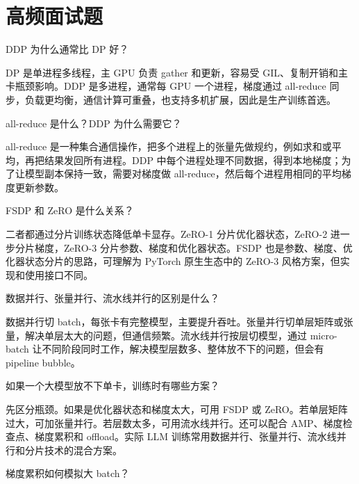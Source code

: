 \section{高频面试题}
\begin{interview}
DDP 为什么通常比 DP 好？
\end{interview}
\begin{answer}
DP 是单进程多线程，主 GPU 负责 gather 和更新，容易受 GIL、复制开销和主卡瓶颈影响。DDP 是多进程，通常每 GPU 一个进程，梯度通过 all-reduce 同步，负载更均衡，通信计算可重叠，也支持多机扩展，因此是生产训练首选。
\end{answer}
\begin{interview}
all-reduce 是什么？DDP 为什么需要它？
\end{interview}
\begin{answer}
all-reduce 是一种集合通信操作，把多个进程上的张量先做规约，例如求和或平均，再把结果发回所有进程。DDP 中每个进程处理不同数据，得到本地梯度；为了让模型副本保持一致，需要对梯度做 all-reduce，然后每个进程用相同的平均梯度更新参数。
\end{answer}
\begin{interview}
FSDP 和 ZeRO 是什么关系？
\end{interview}
\begin{answer}
二者都通过分片训练状态降低单卡显存。ZeRO-1 分片优化器状态，ZeRO-2 进一步分片梯度，ZeRO-3 分片参数、梯度和优化器状态。FSDP 也是参数、梯度、优化器状态分片的思路，可理解为 PyTorch 原生生态中的 ZeRO-3 风格方案，但实现和使用接口不同。
\end{answer}
\begin{interview}
数据并行、张量并行、流水线并行的区别是什么？
\end{interview}
\begin{answer}
数据并行切 batch，每张卡有完整模型，主要提升吞吐。张量并行切单层矩阵或张量，解决单层太大的问题，但通信频繁。流水线并行按层切模型，通过 micro-batch 让不同阶段同时工作，解决模型层数多、整体放不下的问题，但会有 pipeline bubble。
\end{answer}
\begin{interview}
如果一个大模型放不下单卡，训练时有哪些方案？
\end{interview}
\begin{answer}
先区分瓶颈。如果是优化器状态和梯度太大，可用 FSDP 或 ZeRO。若单层矩阵过大，可加张量并行。若层数太多，可用流水线并行。还可以配合 AMP、梯度检查点、梯度累积和 offload。实际 LLM 训练常用数据并行、张量并行、流水线并行和分片技术的混合方案。
\end{answer}
\begin{interview}
梯度累积如何模拟大 batch？
\end{interview}
